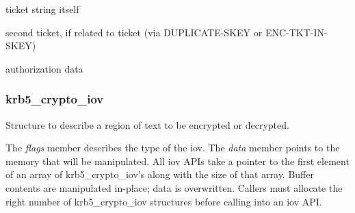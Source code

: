 \documentclass[letterpaper,10pt,english]{sphinxmanual}
\begin{document}
\begin{fulllineitems}
\label{appdev/refs/types/krb5_creds:c.krb5_creds.ticket}
ticket string itself

\end{fulllineitems}


\begin{fulllineitems}
\label{appdev/refs/types/krb5_creds:c.krb5_creds.second_ticket}
second ticket, if related to ticket (via DUPLICATE-SKEY or ENC-TKT-IN-SKEY)

\end{fulllineitems}


\begin{fulllineitems}
\label{appdev/refs/types/krb5_creds:c.krb5_creds.authdata}
authorization data

\end{fulllineitems}



\subsubsection{krb5\_crypto\_iov}
\label{appdev/refs/types/krb5_crypto_iov:krb5-crypto-iov}\label{appdev/refs/types/krb5_crypto_iov::doc}\label{appdev/refs/types/krb5_crypto_iov:krb5-crypto-iov-struct}

\begin{fulllineitems}
\label{appdev/refs/types/krb5_crypto_iov:c.krb5_crypto_iov}
\end{fulllineitems}


Structure to describe a region of text to be encrypted or decrypted.

The \emph{flags} member describes the type of the iov. The \emph{data} member points to the memory that will be manipulated. All iov APIs take a pointer to the first element of an array of krb5\_crypto\_iov's along with the size of that array. Buffer contents are manipulated in-place; data is overwritten. Callers must allocate the right number of krb5\_crypto\_iov structures before calling into an iov API.
\end{document}
